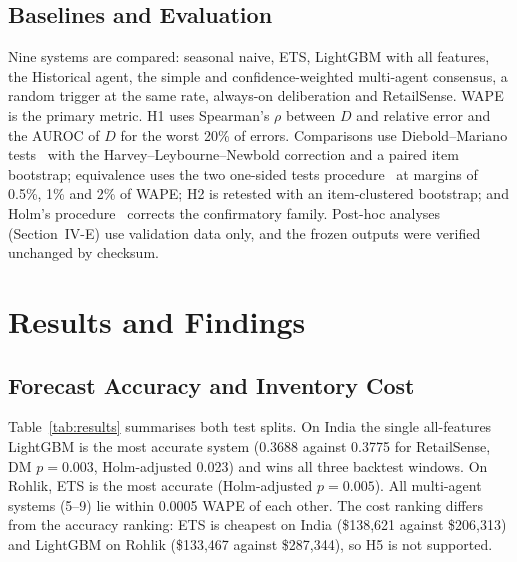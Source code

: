 \documentclass[conference]{IEEEtran}
\begin{document}
\subsection{Baselines and Evaluation}
Nine systems are compared: seasonal naive, ETS, LightGBM with all features, the Historical agent, the
simple and confidence-weighted multi-agent consensus, a random trigger at the same rate, always-on
deliberation and RetailSense. WAPE is the primary metric. H1 uses Spearman's $\rho$ between $D$ and
relative error and the AUROC of $D$ for the worst 20\% of errors. Comparisons use Diebold--Mariano
tests~\cite{diebold1995} with the Harvey--Leybourne--Newbold correction and a paired item bootstrap;
equivalence uses the two one-sided tests procedure~\cite{schuirmann1987} at margins of 0.5\%, 1\% and
2\% of WAPE; H2 is retested with an item-clustered bootstrap; and Holm's procedure~\cite{holm1979}
corrects the confirmatory family. Post-hoc analyses (Section~IV-E) use validation data only, and the
frozen outputs were verified unchanged by checksum.

\section{Results and Findings}\label{sec:results}

\subsection{Forecast Accuracy and Inventory Cost}
Table~\ref{tab:results} summarises both test splits. On India the single all-features LightGBM is the
most accurate system (0.3688 against 0.3775 for RetailSense, DM $p=0.003$, Holm-adjusted 0.023) and
wins all three backtest windows. On Rohlik, ETS is the most accurate (Holm-adjusted $p=0.005$). All
multi-agent systems (5--9) lie within 0.0005 WAPE of each other. The cost ranking differs from the
accuracy ranking: ETS is cheapest on India (\$138,621 against \$206,313) and LightGBM on Rohlik
(\$133,467 against \$287,344), so H5 is not supported.
\end{document}
